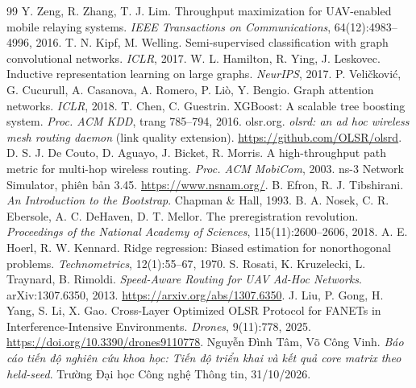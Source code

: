 \documentclass[12pt,a4paper]{report}
\newcommand{\HoTenA}{Nguyễn Đình Tâm}
\newcommand{\HoTenB}{Võ Công Vinh}
\begin{document}
\begin{thebibliography}{99}
 Y. Zeng, R. Zhang, T. J. Lim. Throughput maximization for UAV-enabled mobile relaying systems. \textit{IEEE Transactions on Communications}, 64(12):4983--4996, 2016.
 T. N. Kipf, M. Welling. Semi-supervised classification with graph convolutional networks. \textit{ICLR}, 2017.
 W. L. Hamilton, R. Ying, J. Leskovec. Inductive representation learning on large graphs. \textit{NeurIPS}, 2017.
 P. Veličković, G. Cucurull, A. Casanova, A. Romero, P. Liò, Y. Bengio. Graph attention networks. \textit{ICLR}, 2018.
 T. Chen, C. Guestrin. XGBoost: A scalable tree boosting system. \textit{Proc. ACM KDD}, trang 785--794, 2016.
 olsr.org. \textit{olsrd: an ad hoc wireless mesh routing daemon} (link quality extension). \url{https://github.com/OLSR/olsrd}.
 D. S. J. De Couto, D. Aguayo, J. Bicket, R. Morris. A high-throughput path metric for multi-hop wireless routing. \textit{Proc. ACM MobiCom}, 2003.
 ns-3 Network Simulator, phiên bản 3.45. \url{https://www.nsnam.org/}.
 B. Efron, R. J. Tibshirani. \textit{An Introduction to the Bootstrap}. Chapman \& Hall, 1993.
 B. A. Nosek, C. R. Ebersole, A. C. DeHaven, D. T. Mellor. The preregistration revolution. \textit{Proceedings of the National Academy of Sciences}, 115(11):2600--2606, 2018.
 A. E. Hoerl, R. W. Kennard. Ridge regression: Biased estimation for nonorthogonal problems. \textit{Technometrics}, 12(1):55--67, 1970.
 S. Rosati, K. Kruzelecki, L. Traynard, B. Rimoldi. \textit{Speed-Aware Routing for UAV Ad-Hoc Networks}. arXiv:1307.6350, 2013. \url{https://arxiv.org/abs/1307.6350}.
 J. Liu, P. Gong, H. Yang, S. Li, X. Gao. Cross-Layer Optimized OLSR Protocol for FANETs in Interference-Intensive Environments. \textit{Drones}, 9(11):778, 2025. \url{https://doi.org/10.3390/drones9110778}.
 \HoTenA, \HoTenB. \textit{Báo cáo tiến độ nghiên cứu khoa học: Tiến độ triển khai và kết quả core matrix theo held-seed}. Trường Đại học Công nghệ Thông tin, 31/10/2026.
\end{thebibliography}
\end{document}
